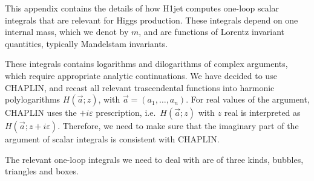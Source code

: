 \documentclass[12pt,a4wide]{article}
\begin{document}
This appendix contains the details of how H1jet computes one-loop
scalar integrals that are relevant for Higgs production. These
integrals depend on one internal mass, which we denot by $m$, and are
functions of Lorentz invariant quantities, typically Mandelstam
invariants.

These integrals contains logarithms and dilogarithms of complex
arguments, which require appropriate analytic continuations. We have
decided to use CHAPLIN, and recast all relevant trascendental
functions into harmonic polylogarithms $H(\vec a;z)$, with
$\vec a=(a_1,\dots,a_n)$. For real values of the argument, CHAPLIN
uses the $+i\varepsilon$ prescription, i.e.\ $H(\vec a;z)$ with $z$
real is interpreted as $H(\vec a;z+i\varepsilon)$. Therefore, we need
to make sure that the imaginary part of the argument of scalar
integrals is consistent with CHAPLIN.

The relevant one-loop integrals we need to deal with are of  three kinds, 
bubbles, triangles and boxes.
\end{document}
